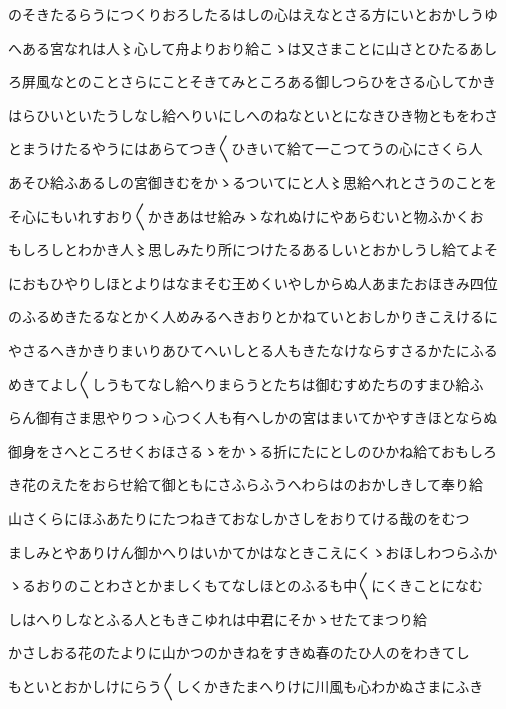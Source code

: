 \documentclass[a4paper,11pt,landscape]{ltjtarticle}
\begin{document}
\par\medskip
のそきたるらうにつくりおろしたるはしの心はえなとさる方にいとおかしうゆ
\par\medskip
へある宮なれは人〻心して舟よりおり給こゝは又さまことに山さとひたるあし
\par\medskip
ろ屏風なとのことさらにことそきてみところある御しつらひをさる心してかき
\par\medskip
はらひいといたうしなし給へりいにしへのねなといとになきひき物ともをわさ
\par\medskip
とまうけたるやうにはあらてつき〱ひきいて給て一こつてうの心にさくら人
\par\medskip
あそひ給ふあるしの宮御きむをかゝるついてにと人〻思給へれとさうのことを
\par\medskip
そ心にもいれすおり〱かきあはせ給みゝなれぬけにやあらむいと物ふかくお
\par\medskip
もしろしとわかき人〻思しみたり所につけたるあるしいとおかしうし給てよそ
\par\medskip
におもひやりしほとよりはなまそむ王めくいやしからぬ人あまたおほきみ四位
\par\medskip
のふるめきたるなとかく人めみるへきおりとかねていとおしかりきこえけるに
\par\medskip
やさるへきかきりまいりあひてへいしとる人もきたなけならすさるかたにふる
\par\medskip
めきてよし〱しうもてなし給へりまらうとたちは御むすめたちのすまひ給ふ
\par\medskip
らん御有さま思やりつゝ心つく人も有へしかの宮はまいてかやすきほとならぬ
\par\medskip
御身をさへところせくおほさるゝをかゝる折にたにとしのひかね給ておもしろ
\par\medskip
き花のえたをおらせ給て御ともにさふらふうへわらはのおかしきして奉り給
\par\medskip
山さくらにほふあたりにたつねきておなしかさしをおりてける哉のをむつ
\par\medskip
ましみとやありけん御かへりはいかてかはなときこえにくゝおほしわつらふか
\par\medskip
ゝるおりのことわさとかましくもてなしほとのふるも中〱にくきことになむ
\par\medskip
しはへりしなとふる人ともきこゆれは中君にそかゝせたてまつり給
\par\medskip
かさしおる花のたよりに山かつのかきねをすきぬ春のたひ人のをわきてし
\par\medskip
もといとおかしけにらう〱しくかきたまへりけに川風も心わかぬさまにふき
\par\medskip
\end{document}
